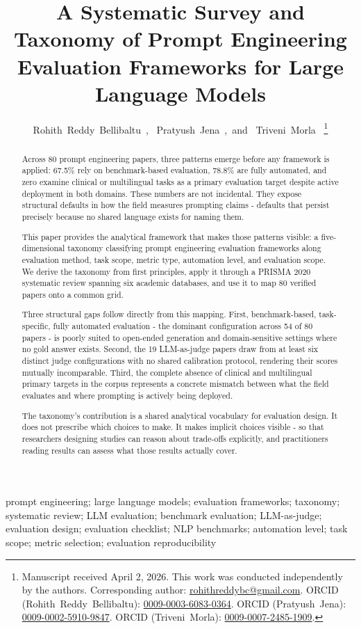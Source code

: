 \documentclass[journal]{IEEEtran}
\title{A Systematic Survey and Taxonomy of Prompt Engineering Evaluation
Frameworks for Large Language Models}
\author{Rohith~Reddy~Bellibaltu~\orcidlink{0009-0003-6083-0364},~
        Pratyush~Jena~\orcidlink{0009-0002-5910-9847},~and~
        Triveni~Morla~\orcidlink{0009-0007-2485-1909}
  \thanks{Manuscript received April 2, 2026. This work was conducted
  independently by the authors. Corresponding author:
  \href{mailto:rohithreddybc@gmail.com}{rohithreddybc@gmail.com}.
  ORCID (Rohith~Reddy~Bellibaltu):
  \href{https://orcid.org/0009-0003-6083-0364}{0009-0003-6083-0364}.
  ORCID (Pratyush~Jena):
  \href{https://orcid.org/0009-0002-5910-9847}{0009-0002-5910-9847}.
  ORCID (Triveni~Morla):
  \href{https://orcid.org/0009-0007-2485-1909}{0009-0007-2485-1909}.}
}
\begin{document}

\maketitle

\begin{abstract}
Across 80 prompt engineering papers, three patterns emerge before any
framework is applied: 67.5\% rely on benchmark-based evaluation, 78.8\% are
fully automated, and zero examine clinical or multilingual tasks as a primary
evaluation target despite active deployment in both domains. These numbers are
not incidental. They expose structural defaults in how the field measures
prompting claims - defaults that persist precisely because no shared language
exists for naming them.

This paper provides the analytical framework that makes those patterns visible:
a five-dimensional taxonomy classifying prompt engineering evaluation frameworks
along evaluation method, task scope, metric type, automation level, and
evaluation scope. We derive the taxonomy from first principles, apply it through
a PRISMA 2020 systematic review spanning six academic databases, and use it to
map 80 verified papers onto a common grid.

Three structural gaps follow directly from this mapping. First, benchmark-based,
task-specific, fully automated evaluation - the dominant configuration across
54 of 80 papers - is poorly suited to open-ended generation and
domain-sensitive settings where no gold answer exists. Second, the 19
LLM-as-judge papers draw from at least six distinct judge configurations with
no shared calibration protocol, rendering their scores mutually incomparable.
Third, the complete absence of clinical and multilingual primary targets
in the corpus represents a concrete mismatch between what the field evaluates
and where prompting is actively being deployed.

The taxonomy's contribution is a shared analytical vocabulary for evaluation
design. It does not prescribe which choices to make. It makes implicit choices
visible - so that researchers designing studies can reason about trade-offs
explicitly, and practitioners reading results can assess what those results
actually cover.
\end{abstract}

\begin{IEEEkeywords}
prompt engineering; large language models; evaluation frameworks; taxonomy;
systematic review; LLM evaluation; benchmark evaluation; LLM-as-judge;
evaluation design; evaluation checklist; NLP benchmarks; automation level;
task scope; metric selection; evaluation reproducibility
\end{IEEEkeywords}
\end{document}
